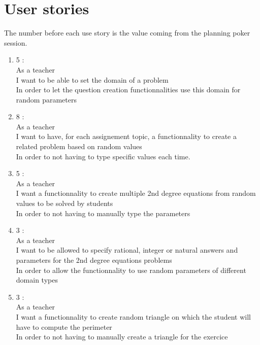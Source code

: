\documentclass{article}
\begin{document}
\section{User stories}

The number before each use story is the value coming from the planning poker session.\\

\begin{enumerate}

    
    
    \item 5 :\\ %
    As a teacher\\
    I want to be able to set the domain of a problem\\
    In order to let the question creation functionnalities use this domain for random parameters\\
    
    \item 8 :\\ %
    As a teacher\\
    I want to have, for each assignement topic, a functionnality to create a related problem based on random values\\
    In order to not having to type specific values each time.\\
    
    \item 5 :\\ %
    As a teacher\\
    I want a functionnality to create multiple 2nd degree equations from random values to be solved by students\\
    In order to not having to manually type the parameters\\
    
    \item 3 :\\ %
    As a teacher\\
    I want to be allowed to specify rational, integer or natural answers and parameters for the 2nd degree equations problems\\
    In order to allow the functionnality to use random parameters of different domain types\\
    
    \item 3 :\\
    As a teacher\\ %
    I want a functionnality to create random triangle on which the student will have to compute the perimeter\\
    In order to not having to manually create a triangle for the exercice\\
    

\end{enumerate}
\end{document}

